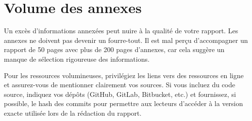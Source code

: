 \section{Volume des annexes}

Un excès d'informations annexées peut nuire à la qualité de votre rapport. Les annexes ne doivent pas devenir un fourre-tout. Il est mal perçu d'accompagner un rapport de 50 pages avec plus de 200 pages d'annexes, car cela suggère un manque de sélection rigoureuse des informations.

Pour les ressources volumineuses, privilégiez les liens vers des ressources en ligne et assurez-vous de mentionner clairement vos sources. Si vous incluez du code source, indiquez vos dépôts (GitHub, GitLab, Bitbucket, etc.) et fournissez, si possible, le hash des commits pour permettre aux lecteurs d'accéder à la version exacte utilisée lors de la rédaction du rapport.